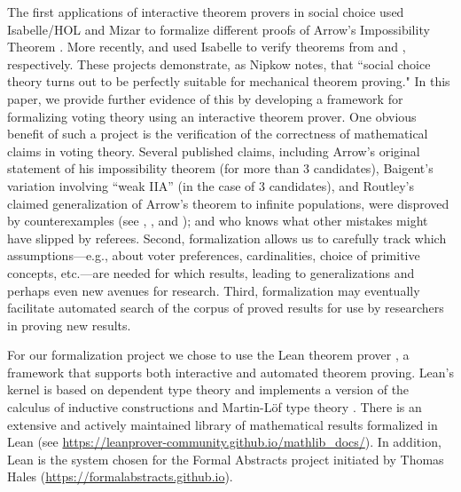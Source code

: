 \documentclass[runningheads]{llncs}
\begin{document}
The first applications of interactive theorem provers in social choice used Isabelle/HOL  \cite{Nipkow2009} and Mizar \cite{Wiedijk2007} to formalize different proofs of  Arrow's Impossibility Theorem \cite{Geanakoplos2005}.  More recently, \cite{Brandt2018b} and \cite{Eberl2019} used Isabelle to verify theorems from \cite{Brandt2018} and \cite{Brandl2018}, respectively.  These projects demonstrate, as Nipkow \cite{Nipkow2009} notes,  that ``social choice theory turns out to be perfectly suitable for mechanical theorem proving."  In this paper, we provide further evidence of this by developing a framework for formalizing voting theory using an interactive theorem prover. One obvious benefit of such a project is the verification of the correctness of mathematical claims in voting theory. Several published claims, including Arrow's \cite{Arrow1951} original statement of his impossibility theorem (for more than 3 candidates), Baigent's \cite{Baigent1987} variation involving ``weak IIA'' (in the case of 3 candidates), and Routley's \cite{Routley1979} claimed generalization of Arrow's theorem to infinite populations, were disproved by counterexamples (see \cite{Blau1957}, \cite{Campbell2000}, and \cite{Blau1979}); and who knows what other mistakes might have slipped by referees. Second, formalization allows us to carefully track  which assumptions---e.g., about voter preferences, cardinalities, choice of primitive concepts, etc.---are needed for which results, leading to generalizations and perhaps even new avenues for research. Third, formalization may eventually facilitate automated search of the corpus of proved results for use by researchers in proving new results.


For our formalization project we chose to use the Lean theorem prover \cite{Lean}, a framework that supports both interactive and automated theorem proving.   Lean's kernel is based on dependent type theory and   implements a version of the calculus of inductive constructions \cite{Coquand1988}  and Martin-L\"of type theory \cite{MartinLof1984}. There is an extensive and actively maintained  library of mathematical results formalized in Lean (see \url{https://leanprover-community.github.io/mathlib_docs/}). In addition, Lean is the system chosen for the Formal Abstracts project initiated by Thomas Hales (\url{https://formalabstracts.github.io}). %
 
\end{document}

